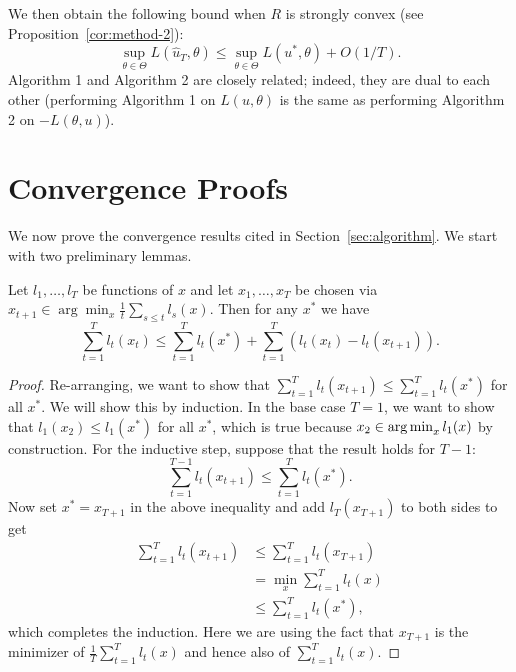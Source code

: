 \documentclass{article}
\begin{document}
We then obtain the following bound 
when $R$ is strongly convex (see Proposition~\ref{cor:method-2}):
\[ \sup_{\theta \in \Theta} L(\hat{u}_T, \theta) \leq \sup_{\theta \in \Theta} L(u^*, \theta) + O(1/T). \]
Algorithm 1 and Algorithm 2 are closely related; indeed, they are dual to each other 
(performing Algorithm 1 on $L(u,\theta)$ is the same as performing Algorithm 2 on 
$-L(\theta,u)$).

\section{Convergence Proofs}
\label{sec:proofs}
We now prove the convergence results cited in Section~\ref{sec:algorithm}. 
We start with two preliminary lemmas.
\begin{lemma}
\label{lem:ftl}
Let $l_1,\ldots,l_T$ be functions of $x$ and let $x_1,\ldots,x_T$ 
be chosen via $x_{t+1} \in \arg\min_{x} \frac{1}{t} \sum_{s \leq t} l_s(x)$. 
Then for any $x^*$ we have
\[ \sum_{t=1}^T l_t(x_t) \leq \sum_{t=1}^T l_t(x^*) + \sum_{t=1}^T (l_t(x_t) - l_t(x_{t+1})). \]
\end{lemma}
\begin{proof}
Re-arranging, we want to show that $\sum_{t=1}^T l_t(x_{t+1}) \leq \sum_{t=1}^T l_t(x^*)$ for 
all $x^*$. We will show this by induction. In the base case $T=1$, we want to show that $l_1(x_2) \leq l_1(x^*)$ 
for all $x^*$, which is true because $x_2 \in \argmin_x l_1(x)$ by construction. For 
the inductive step, suppose that the result holds for $T-1$:
\[ \sum_{t=1}^{T-1} l_t(x_{t+1}) \leq \sum_{t=1}^T l_t(x^*). \]
Now set $x^* = x_{T+1}$ in the above inequality and 
add $l_T(x_{T+1})$ to both sides to get
\begin{align*}
\sum_{t=1}^T l_t(x_{t+1}) &\leq \sum_{t=1}^T l_t(x_{T+1}) \\
 &= \min_{x} \sum_{t=1}^T l_t(x) \\
 &\leq \sum_{t=1}^T l_t(x^*),
\end{align*}
which completes the induction. Here we are using the fact that $x_{T+1}$ 
is the minimizer of $\frac{1}{T} \sum_{t=1}^T l_t(x)$ and hence also of 
$\sum_{t=1}^T l_t(x)$.
\end{proof}
\end{document}
